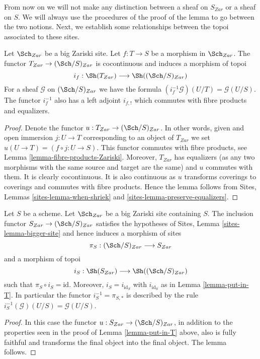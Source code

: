 \noindent
From now on we will not make any distinction between a sheaf on
$S_{Zar}$ or a sheaf on $S$. We will always use the procedures
of the proof of the lemma to go between the two notions.
Next, we establish some relationships between the topoi
associated to these sites.

\begin{lemma}
\label{lemma-put-in-T}
Let $\Sch_{Zar}$ be a big Zariski site.
Let $f : T \to S$ be a morphism in $\Sch_{Zar}$.
The functor $T_{Zar} \to (\Sch/S)_{Zar}$
is cocontinuous and induces a morphism of topoi
$$
i_f :
\Sh(T_{Zar})
\longrightarrow
\Sh((\Sch/S)_{Zar})
$$
For a sheaf $\mathcal{G}$ on $(\Sch/S)_{Zar}$
we have the formula $(i_f^{-1}\mathcal{G})(U/T) = \mathcal{G}(U/S)$.
The functor $i_f^{-1}$ also has a left adjoint $i_{f, !}$ which commutes
with fibre products and equalizers.
\end{lemma}

\begin{proof}
Denote the functor $u : T_{Zar} \to (\Sch/S)_{Zar}$.
In other words, given and open immersion $j : U \to T$ corresponding
to an object of $T_{Zar}$ we set $u(U \to T) = (f \circ j : U \to S)$.
This functor commutes with fibre products, see
Lemma \ref{lemma-fibre-products-Zariski}.
Moreover, $T_{Zar}$ has equalizers (as any two morphisms with the same
source and target are the same) and $u$ commutes with them.
It is clearly cocontinuous.
It is also continuous as $u$ transforms coverings to coverings and
commutes with fibre products. Hence the lemma follows from
Sites, Lemmas \ref{sites-lemma-when-shriek}
and \ref{sites-lemma-preserve-equalizers}.
\end{proof}

\begin{lemma}
\label{lemma-at-the-bottom}
Let $S$ be a scheme. Let $\Sch_{Zar}$ be a big Zariski
site containing $S$.
The inclusion functor $S_{Zar} \to (\Sch/S)_{Zar}$
satisfies the hypotheses of Sites, Lemma \ref{sites-lemma-bigger-site}
and hence induces a morphism of sites
$$
\pi_S : (\Sch/S)_{Zar} \longrightarrow S_{Zar}
$$
and a morphism of topoi
$$
i_S : \Sh(S_{Zar}) \longrightarrow \Sh((\Sch/S)_{Zar})
$$
such that $\pi_S \circ i_S = \text{id}$. Moreover, $i_S = i_{\text{id}_S}$
with $i_{\text{id}_S}$ as in Lemma \ref{lemma-put-in-T}. In particular the
functor $i_S^{-1} = \pi_{S, *}$ is described by the rule
$i_S^{-1}(\mathcal{G})(U/S) = \mathcal{G}(U/S)$.
\end{lemma}

\begin{proof}
In this case the functor $u : S_{Zar} \to (\Sch/S)_{Zar}$,
in addition to the properties seen in the proof of
Lemma \ref{lemma-put-in-T} above, also is fully faithful
and transforms the final object into the final object.
The lemma follows.
\end{proof}

